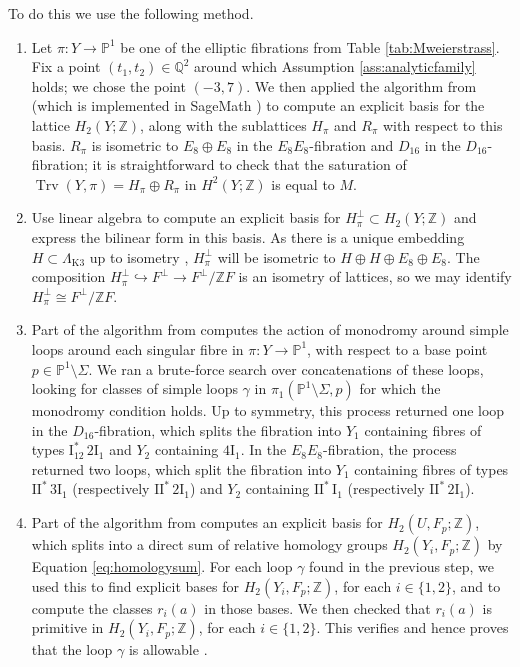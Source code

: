 \documentclass[a4paper]{amsart}
\theoremstyle{definition}
\theoremstyle{plain}
\theoremstyle{remark}
\newcommand{\bP}{\mathbb{P}}
\newcommand{\bQ}{\mathbb{Q}}
\newcommand{\bZ}{\mathbb{Z}}
\newcommand{\rmI}{\mathrm{I}}
\newcommand{\rmK}{\mathrm{K}}
\DeclareMathOperator{\Trv}{Trv}
\numberwithin{figure}{section}
\numberwithin{table}{section}
\begin{document}
To do this we use the following method.
\begin{enumerate}
\item Let $\pi\colon Y \to \bP^1$ be one of the elliptic fibrations from Table \ref{tab:Mweierstrass}. Fix a point $(t_1,t_2) \in \bQ^2$ around which Assumption \ref{ass:analyticfamily} holds; we chose the point $(-3,7)$. We then applied the algorithm from \cite{snahlpcesp1} (which is implemented in SageMath \cite{sage}) to compute an explicit basis for the lattice $H_2(Y;\bZ)$, along with the sublattices $H_{\pi}$ and $R_{\pi}$ with respect to this basis. $R_{\pi}$ is isometric to $E_8 \oplus E_8$ in the $E_8E_8$-fibration and $D_{16}$ in the $D_{16}$-fibration; it is straightforward to check that the saturation of $\Trv(Y,\pi) = H_{\pi} \oplus R_{\pi}$ in $H^2(Y;\bZ)$ is equal to $M$.
\item Use linear algebra to compute an explicit basis for $H^{\perp}_{\pi} \subset H_2(Y;\bZ)$ and express the bilinear form in this basis. As there is a unique embedding $H \subset \Lambda_{\rmK 3}$ up to isometry \cite[Proposition 1.6.1]{isbfa}, $H^{\perp}_{\pi}$ will be isometric to $H \oplus H \oplus E_8 \oplus E_8$.  The composition $H_{\pi}^{\perp} \hookrightarrow F^{\perp} \to F^{\perp}/\bZ F$ is an isometry of lattices, so we may identify $H_{\pi}^{\perp} \cong F^{\perp}/\bZ F$.
\item Part of the algorithm from \cite{snahlpcesp1} computes the action of monodromy around simple loops around each singular fibre in $\pi\colon Y \to \bP^1$, with respect to a base point $p \in \bP^1 \setminus \Sigma$. We ran a brute-force search over concatenations of these loops, looking for classes of simple loops $\gamma$ in $\pi_1(\bP^1 \setminus \Sigma,p)$ for which the monodromy condition \cite[Assumption 4.9(1)]{dfk3slpms} holds. Up to symmetry, this process returned one loop in the $D_{16}$-fibration, which splits the fibration into $Y_1$ containing fibres of types $\rmI_{12}^*\,  2\rmI_1$ and $Y_2$ containing $4\rmI_1$. In the $E_8E_8$-fibration, the process returned two loops, which split the fibration into $Y_1$ containing fibres of types $\rmI\rmI^*\, 3\rmI_1$ (respectively  $\rmI\rmI^*\, 2\rmI_1$) and $Y_2$ containing $\rmI\rmI^*\, \rmI_1$ (respectively  $\rmI\rmI^*\, 2\rmI_1$).
\item Part of the algorithm from \cite{snahlpcesp1} computes an explicit basis for $H_2(U,F_p;\bZ)$, which splits into a direct sum of relative homology groups $H_2(Y_i,F_p;\bZ)$ by Equation \eqref{eq:homologysum}. For each loop $\gamma$ found in the previous step, we used this to find explicit bases for $H_2(Y_i,F_p;\bZ)$, for each $i \in\{1,2\}$, and to compute the classes $r_i(a)$ in those bases. We then checked that $r_i(a)$ is primitive in $H_2(Y_i,F_p;\bZ)$, for each $i \in \{1,2\}$. This verifies \cite[Assumption 4.9(2)]{dfk3slpms} and hence proves that the loop $\gamma$ is allowable \cite[Definition 4.11]{dfk3slpms}.

\end{enumerate}
\end{document}
